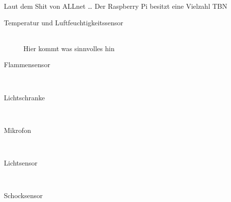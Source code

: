 
Laut dem Shit von ALLnet \cite{111861pd90} \ldots
Der Raspberry Pi besitzt eine Vielzahl  TBN

\begin{description}
\item[Temperatur und Luftfeuchtigkeitssensor] \hfill \\
	Hier kommt was sinnvolles hin
\item[Flammensensor]\hfill \\
\item[Lichtschranke]\hfill \\
\item[Mikrofon]\hfill \\
\item[Lichtsensor]\hfill \\
\item[Schocksensor]\hfill \\
\end{description}